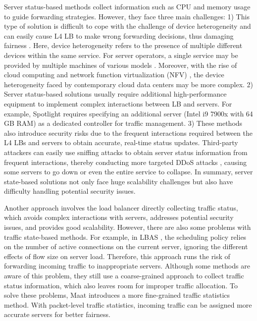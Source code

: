 Server status-based methods collect information such as CPU and memory usage to guide forwarding strategies. However, they face three main challenges: 1) This type of solution is difficult to cope with the challenge of device heterogeneity and can easily cause L4 LB to make wrong forwarding decisions, thus damaging fairness \cite{zhang2020fast}. Here, device heterogeneity \cite{abdelmoniem2021towards} refers to the presence of multiple different devices within the same service. For server operators, a single service may be provided by multiple machines of various models \cite{sharma2011modeling}. Moreover, with the rise of cloud computing \cite{garg2014sla} and network function virtualization (NFV) \cite{lin2017enabling}, the device heterogeneity faced by contemporary cloud data centers may be more complex. 2) Server status-based solutions usually require additional high-performance equipment to implement complex interactions between LB and servers. For example, Spotlight \cite{aghdai2020spotlight} requires specifying an additional server (Intel i9 7900x with 64 GB RAM) as a dedicated controller for traffic management. 3) These methods also introduce security risks due to the frequent interactions required between the L4 LBs and servers to obtain accurate, real-time status updates. Third-party attackers can easily use sniffing attacks \cite{xiao2015detecting} to obtain server status information from frequent interactions, thereby conducting more targeted DDoS attacks \cite{garber2000denial}, causing some servers to go down or even the entire service to collapse. In summary, server state-based solutions not only face huge scalability challenges but also have difficulty handling potential security issues.

Another approach involves the load balancer directly collecting traffic status, which avoids complex interactions with servers, addresses potential security issues, and provides good scalability. However, there are also some problems with traffic state-based methods. For example, in LBAS \cite{zhang2020fast}, the scheduling policy relies on the number of active connections on the current server, ignoring the different effects of flow size on server load. Therefore, this approach runs the risk of forwarding incoming traffic to inappropriate servers. Although some methods \cite{guo2022libra} are aware of this problem, they still use a coarse-grained approach to collect traffic status information, which also leaves room for improper traffic allocation. To solve these problems, Maat introduces a more fine-grained traffic statistics method. With packet-level traffic statistics, incoming traffic can be assigned more accurate servers for better fairness.


